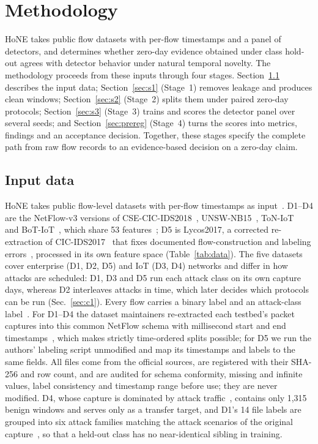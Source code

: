 \documentclass[conference]{IEEEtran}
\begin{document}
\section{Methodology}
\label{sec:method}
HoNE takes public flow datasets with per-flow timestamps and a panel of detectors, and determines whether zero-day evidence obtained under class hold-out agrees with detector behavior under natural temporal novelty. The methodology proceeds from these inputs through four stages. Section~\ref{sec:data} describes the input data; Section~\ref{sec:s1} (Stage~1) removes leakage and produces clean windows; Section~\ref{sec:s2} (Stage~2) splits them under paired zero-day protocols; Section~\ref{sec:s3} (Stage~3) trains and scores the detector panel over several seeds; and Section~\ref{sec:prereg} (Stage~4) turns the scores into metrics, findings and an acceptance decision. Together, these stages specify the complete path from raw flow records to an evidence-based decision on a zero-day claim.

\subsection{Input data}
\label{sec:data}
HoNE takes public flow-level datasets with per-flow timestamps as input~\cite{sarhan2021netflow,luay2025}. D1--D4 are the NetFlow-v3 versions of CSE-CIC-IDS2018~\cite{sharafaldin2018}, UNSW-NB15~\cite{moustafa2015}, ToN-IoT~\cite{moustafa2021} and BoT-IoT~\cite{koroniotis2019}, which share 53 features~\cite{luay2025}; D5 is Lycos2017, a corrected re-extraction of CIC-IDS2017~\cite{sharafaldin2018} that fixes documented flow-construction and labeling errors~\cite{engelen2021,rosay2021}, processed in its own feature space (Table~\ref{tab:data}). The five datasets cover enterprise (D1, D2, D5) and IoT (D3, D4) networks and differ in how attacks are scheduled: D1, D3 and D5 run each attack class on its own capture days, whereas D2 interleaves attacks in time, which later decides which protocols can be run (Sec.~\ref{sec:c1}).
Every flow carries a binary label and an attack-class label~\cite{sarhan2021netflow,sarhan2022standard}. For D1--D4 the dataset maintainers re-extracted each testbed's packet captures into this common NetFlow schema with millisecond start and end timestamps~\cite{sarhan2021netflow}, which makes strictly time-ordered splits possible; for D5 we run the authors' labeling script unmodified and map its timestamps and labels to the same fields. All files come from the official sources, are registered with their SHA-256 and row count, and are audited for schema conformity, missing and infinite values, label consistency and timestamp range before use; they are never modified. D4, whose capture is dominated by attack traffic~\cite{koroniotis2019}, contains only 1,315 benign windows and serves only as a transfer target, and D1's 14 file labels are grouped into six attack families matching the attack scenarios of the original capture~\cite{sharafaldin2018}, so that a held-out class has no near-identical sibling in training.
\end{document}
